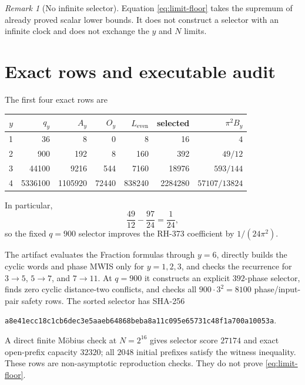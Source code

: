 \documentclass[11pt]{article}
\theoremstyle{definition}
\theoremstyle{remark}
\newtheorem{remark}[theorem]{Remark}
\begin{document}
\begin{remark}[No infinite selector]
Equation \eqref{eq:limit-floor} takes the supremum of already proved scalar
lower bounds.  It does not construct a selector with an infinite clock and
does not exchange the $y$ and $N$ limits.
\end{remark}

\section{Exact rows and executable audit}

The first four exact rows are
\begin{center}
\begin{tabular}{@{}rrrrrrr@{}}
\toprule
$y$ & $q_y$ & $A_y$ & $O_y$ & $L_{\mathrm{even}}$ & selected & $\pi^2B_y$\\
\midrule
1 & 36 & 8 & 0 & 8 & 16 & $4$\\
2 & 900 & 192 & 8 & 160 & 392 & $49/12$\\
3 & 44100 & 9216 & 544 & 7160 & 18976 & $593/144$\\
4 & 5336100 & 1105920 & 72440 & 838240 & 2284280 & $57107/13824$\\
\bottomrule
\end{tabular}
\end{center}
In particular,
\begin{equation}
 \frac{49}{12}-\frac{97}{24}=\frac1{24},
 \label{eq:q900-improvement}
\end{equation}
so the fixed $q=900$ selector improves the RH-373 coefficient by
$1/(24\pi^2)$.

The artifact evaluates the Fraction formulas through $y=6$, directly builds
the cyclic words and phase MWIS only for $y=1,2,3$, and checks the recurrence
for $3\to5$, $5\to7$, and $7\to11$.  At $q=900$ it constructs an explicit $392$-phase
selector, finds zero cyclic distance-two conflicts, and checks all
$900\cdot3^2=8100$ phase/input-pair safety rows.  The sorted selector has
SHA-256
\begin{center}
\texttt{a8e41ecc18c1cb6dec3e5aaeb64868beba8a11c095e65731c48f1a700a10053a}.
\end{center}

A direct finite M\"obius check at $N=2^{16}$ gives selector score $27174$
and exact open-prefix capacity $32320$; all $2048$ initial prefixes satisfy
the witness inequality.  These rows are non-asymptotic reproduction checks.
They do not prove \eqref{eq:limit-floor}.
\end{document}
